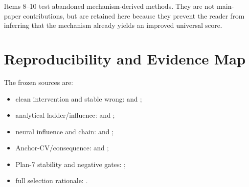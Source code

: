 \documentclass[10pt,twocolumn,letterpaper]{article}
\begin{document}
Items 8--10 test abandoned mechanism-derived methods. They are not main-paper contributions, but are retained here because they prevent the reader from inferring that the mechanism already yields an improved universal score.

\section{Reproducibility and Evidence Map}
The frozen sources are:
\begin{itemize}
\item clean intervention and stable wrong:  and ;
\item analytical ladder/influence:  and ;
\item neural influence and chain:  and ;
\item Anchor-CV/consequence:  and ;
\item Plan-7 stability and negative gates: ;
\item full selection rationale: .
\end{itemize}
\end{document}
